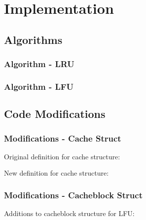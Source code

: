 \documentclass{beamer}
\begin{document}
\section{Implementation}

\subsection{Algorithms}

\begin{frame}
  \frametitle{Algorithm - LRU}

  

\end{frame}

\begin{frame}
  \frametitle{Algorithm - LFU}

  

\end{frame}

\subsection{Code Modifications}

\begin{frame}
  \frametitle{Modifications - Cache Struct}

  Original definition for cache structure:
  \begin{adjustbox}{width=\textwidth,keepaspectratio}
    
  \end{adjustbox}

  \vspace{\baselineskip}

  New definition for cache structure:
  \begin{adjustbox}{width=\textwidth,keepaspectratio}
    
  \end{adjustbox}

\end{frame}

\begin{frame}
  \frametitle{Modifications - Cacheblock Struct}

  Additions to cacheblock structure for LFU:
  \begin{adjustbox}{width=\textwidth,keepaspectratio}
    
  \end{adjustbox}

\end{frame}
\end{document}
